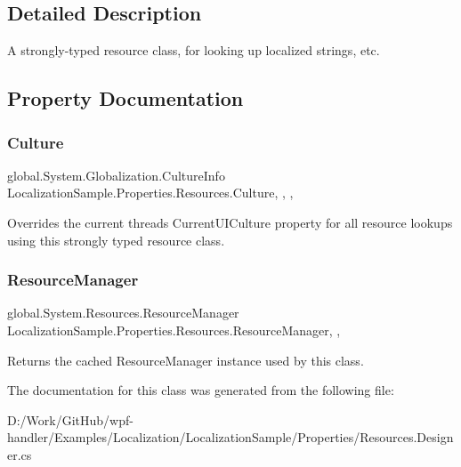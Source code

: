\subsection{Detailed Description}
A strongly-\/typed resource class, for looking up localized strings, etc. 



\subsection{Property Documentation}
\mbox{\label{class_localization_sample_1_1_properties_1_1_resources_a0dc25fd896129a0a3bc93efe0de9280a}} 
\subsubsection{\texorpdfstring{Culture}{Culture}}
{\footnotesize\ttfamily global.\+System.\+Globalization.\+Culture\+Info Localization\+Sample.\+Properties.\+Resources.\+Culture\hspace{0.3cm}{\ttfamily [static]}, {\ttfamily [get]}, {\ttfamily [set]}, {\ttfamily [package]}}



Overrides the current thread\textquotesingle{}s Current\+U\+I\+Culture property for all resource lookups using this strongly typed resource class. 

\mbox{\label{class_localization_sample_1_1_properties_1_1_resources_a55df73946b772c44c69e5f660d4507fc}} 
\subsubsection{\texorpdfstring{Resource\+Manager}{ResourceManager}}
{\footnotesize\ttfamily global.\+System.\+Resources.\+Resource\+Manager Localization\+Sample.\+Properties.\+Resources.\+Resource\+Manager\hspace{0.3cm}{\ttfamily [static]}, {\ttfamily [get]}, {\ttfamily [package]}}



Returns the cached Resource\+Manager instance used by this class. 



The documentation for this class was generated from the following file\+:\begin{DoxyCompactItemize}
\item 
D\+:/\+Work/\+Git\+Hub/wpf-\/handler/\+Examples/\+Localization/\+Localization\+Sample/\+Properties/Resources.\+Designer.\+cs\end{DoxyCompactItemize}
